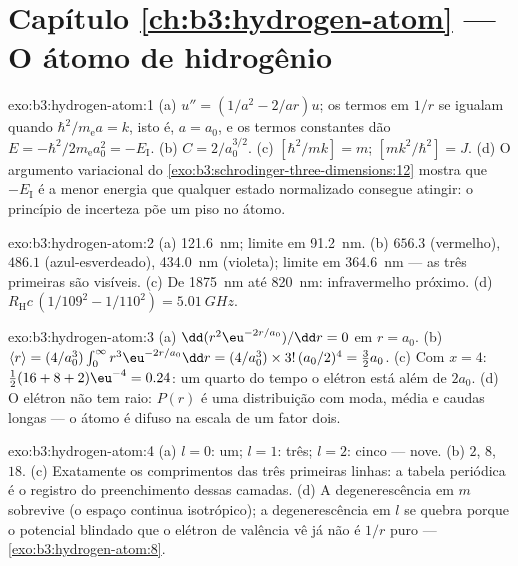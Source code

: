 \section*{Capítulo \ref{ch:b3:hydrogen-atom} --- O átomo de hidrogênio}

\begin{solution}{exo:b3:hydrogen-atom:1}
(a) $u'' = (1/a^2 - 2/ar)u$; os termos em $1/r$ se igualam quando
$\hbar^2/m_{\text{e}}a = k$, isto é, $a = a_0$, e os termos constantes
dão $E = -\hbar^2/2m_{\text{e}}a_0^2 = -E_{\text{I}}$. (b) $C =
2/a_0^{3/2}$. (c) $[\hbar^2/mk] = \unit{m}$; $[mk^2/\hbar^2] =
\unit{J}$. (d) O argumento variacional do
\cref{exo:b3:schrodinger-three-dimensions:12} mostra que
$-E_{\text{I}}$ é a menor energia que qualquer estado normalizado
consegue atingir: o princípio de incerteza põe um piso no átomo.
\end{solution}

\begin{solution}{exo:b3:hydrogen-atom:2}
(a) \qty{121.6}{nm}; limite em \qty{91.2}{nm}. (b) $656.3$ (vermelho),
$486.1$ (azul-esverdeado), \qty{434.0}{nm} (violeta); limite em
\qty{364.6}{nm} --- as três primeiras são visíveis. (c) De
\qty{1875}{nm} até \qty{820}{nm}: infravermelho próximo. (d)
$R_{\text{H}}c\,(1/109^2 - 1/110^2) = \qty{5.01}{GHz}$.
\end{solution}

\begin{solution}{exo:b3:hydrogen-atom:3}
(a) $\dd(r^2\eu^{-2r/a_0})/\dd r = 0$ em $r = a_0$. (b) $\langle r\rangle = (4/a_0^3)\int_0^\infty
r^3\eu^{-2r/a_0}\dd r = (4/a_0^3)\times 3!\,(a_0/2)^4 = \tfrac32
a_0$. (c) Com $x = 4$:
$\tfrac12(16 + 8 + 2)\eu^{-4} = 0.24$: um quarto do tempo o elétron
está além de $2a_0$. (d) O elétron não tem raio: $P(r)$ é uma
distribuição com moda, média e caudas longas --- o átomo é difuso na
escala de um fator dois.
\end{solution}

\begin{solution}{exo:b3:hydrogen-atom:4}
(a) $l = 0$: um; $l = 1$: três; $l = 2$: cinco --- nove. (b) $2$,
$8$, $18$. (c) Exatamente os comprimentos das três primeiras linhas: a
tabela periódica é o registro do preenchimento dessas camadas. (d) A
degenerescência em $m$ sobrevive (o espaço continua isotrópico); a
degenerescência em $l$ se quebra porque o potencial blindado que o
elétron de valência vê já não é $1/r$ puro ---
\cref{exo:b3:hydrogen-atom:8}.
\end{solution}

